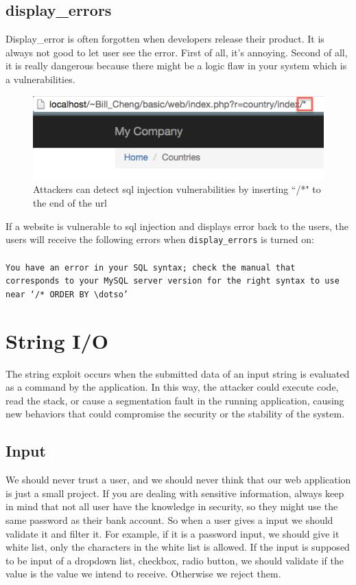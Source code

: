 \documentclass[conference]{IEEEtran}
\begin{document}
\subsection{display\_errors}
Display\_error is often forgotten when developers release their product. It is always not good to let user see the error. First of all, it's annoying. Second of all, it is really dangerous because there might be a logic flaw in your system which is a vulnerabilities. 
\begin{figure}[h]
\includegraphics[scale=0.45]{displayerror}
\centering
\caption{Attackers can detect sql injection vulnerabilities by inserting ``/*" to the end of the url}
\end{figure}

If a website is vulnerable to sql injection and displays error back to the users, the users will receive the following errors when \texttt{display\_errors} is turned on: \\\\
\texttt{You have an error in your SQL syntax; check the manual that corresponds to your MySQL server version for the right syntax to use near `/* ORDER BY $\dotso$'}

\section{String I/O}
The string exploit occurs when the submitted data of an input string is evaluated as a command by the application. In this way, the attacker could execute code, read the stack, or cause a segmentation fault in the running application, causing new behaviors that could compromise the security or the stability of the system.

\subsection{Input}
We should never trust a user, and we should never think that our web application is just a small project. If you are dealing with sensitive information, always keep in mind that not all user have the knowledge in security, so they might use the same password as their bank account. So when a user gives a input we should validate it and filter it. For example, if it is a password input, we should give it white list, only the characters in the white list is allowed. If the input is supposed to be input of a dropdown list, checkbox, radio button, we should validate if the value is the value we intend to receive. Otherwise we reject them.
\end{document}
